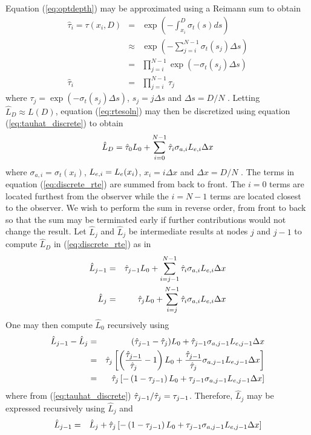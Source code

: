 Equation (\ref{eq:optdepth}) may be approximated using a Reimann
sum  to obtain
\begin{eqnarray}
\nonumber
\hat{\tau}_i=\tau(x_i,D)&=&\exp\left(-\int_{x_i}^D\sigma_t(s)ds\right)\\
\nonumber
&\approx&\exp\left(-\sum_{j=i}^{N-1}\sigma_t(s_j)\Delta s\right)\\
\nonumber
&=&\prod_{j=i}^{N-1}\exp\left(-\sigma_t(s_j)\Delta s\right)\\
\label{eq:tauhat_discrete}
\hat{\tau}_i&=&\prod_{j=i}^{N-1}\tau_j
\end{eqnarray}
where $\tau_j=\exp\left(-\sigma_t(s_j)\Delta s\right)$,
$s_j=j\Delta s$ and $\Delta s=D/N$ . Letting $\hat{L}_D\approx L(D)$, equation (\ref{eq:rtesoln})
may then be discretized using equation (\ref{eq:tauhat_discrete})
to obtain
\begin{equation}
\label{eq:discrete_rte}
\hat{L}_D = \hat{\tau}_{0}L_0 +
\sum_{i=0}^{N-1}\hat{\tau}_{i}\sigma_{a,i}L_{e,i}\Delta x
\end{equation}
where $\sigma_{a,i}=\sigma_t(x_i)$, $L_{e,i}=L_e(x_i)$,
$x_i=i\Delta x$ and $\Delta x=D/N$ .  
The terms in equation (\ref{eq:discrete_rte}) are summed from back to front.  The $i=0$ terms are located
furthest from the observer while the $i=N-1$ terms are located closest to the observer.  We wish to perform the sum in reverse order, from front to back so that the sum may be terminated early if further contributions would not change the result. Let $\hat{L}_j$ and $\hat{L}_j$ be intermediate results at nodes $j$ and $j-1$
to compute $\hat{L}_D$ in (\ref{eq:discrete_rte}) as in
\begin{eqnarray}
\hat{L}_{j-1} &= &\hat{\tau}_{j-1}L_0 + \sum_{i=j-1}^{N-1}\hat{\tau}_{i}\sigma_{a,i}L_{e,i}\Delta x\\
\hat{L}_j     &= &\hat{\tau}_{j}  L_0 + \sum_{i=j}^{N-1}  \hat{\tau}_{i}\sigma_{a,i}L_{e,i}\Delta x
\end{eqnarray}
One may then compute $\hat{L}_0$ recursively using
\begin{eqnarray}
\hat{L}_{j-1} -\hat{L}_{j}&= &(\hat{\tau}_{j-1}-\hat{\tau}_{j})L_0 + \hat{\tau}_{j-1}\sigma_{a,j-1}L_{e,j-1}\Delta x\\
                        &= &\hat{\tau}_{j}\left[\left(\frac{\hat{\tau}_{j-1}}{\hat{\tau}_{j}}-1\right)L_0 + \frac{\hat{\tau}_{j-1}}{\hat{\tau}_{j}}\sigma_{a,j-1}L_{e,j-1}\Delta x\right]\\
                        &= &\hat{\tau}_{j}\left[-\left(1-\tau_{j-1}\right)L_0 + \tau_{j-1}\sigma_{a,j-1}L_{e,j-1}\Delta x\right]\\
\end{eqnarray}
where from (\ref{eq:tauhat_discrete}) $\hat{\tau}_{j-1}/\hat{\tau}_{j}=\tau_{j-1}$.  Therefore, $\hat{L}_j$ may be expressed recursively using $\hat{L}_{j}$ and
\begin{eqnarray}
\hat{L}_{j-1} &= &\hat{L}_{j}+\hat{\tau}_{j}\left[-\left(1-\tau_{j-1}\right)L_0 + \tau_{j-1}\sigma_{a,j-1}L_{e,j-1}\Delta x\right]
\end{eqnarray}
